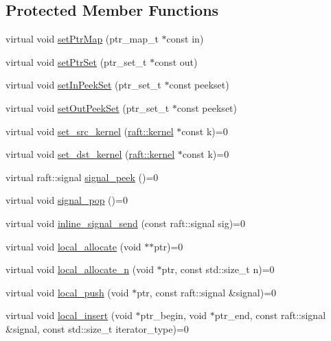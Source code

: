 \subsection*{Protected Member Functions}
\begin{DoxyCompactItemize}
\item 
virtual void \hyperlink{class_f_i_f_o_a6d7f0cf28c0eba5eaa12c347734dbdf2}{set\+Ptr\+Map} (ptr\+\_\+map\+\_\+t $\ast$const in)
\item 
virtual void \hyperlink{class_f_i_f_o_a866988c11d53fae77d6ac6f0b56aae56}{set\+Ptr\+Set} (ptr\+\_\+set\+\_\+t $\ast$const out)
\item 
virtual void \hyperlink{class_f_i_f_o_abccc27a45f6590bb8529513c411b0b5a}{set\+In\+Peek\+Set} (ptr\+\_\+set\+\_\+t $\ast$const peekset)
\item 
virtual void \hyperlink{class_f_i_f_o_aaf19d035ab4e130dbcd78c576cdf0dae}{set\+Out\+Peek\+Set} (ptr\+\_\+set\+\_\+t $\ast$const peekset)
\item 
virtual void \hyperlink{class_f_i_f_o_aa9c1f679b4e2585047af2c09a2518209}{set\+\_\+src\+\_\+kernel} (\hyperlink{classraft_1_1kernel}{raft\+::kernel} $\ast$const k)=0
\item 
virtual void \hyperlink{class_f_i_f_o_a11422695c75c05ad2c60e662553f2667}{set\+\_\+dst\+\_\+kernel} (\hyperlink{classraft_1_1kernel}{raft\+::kernel} $\ast$const k)=0
\item 
virtual raft\+::signal \hyperlink{class_f_i_f_o_a36a7519af834c969d49f3d9ae7080af9}{signal\+\_\+peek} ()=0
\item 
virtual void \hyperlink{class_f_i_f_o_ad6b606d47361489007490e0e0b4e2aa1}{signal\+\_\+pop} ()=0
\item 
virtual void \hyperlink{class_f_i_f_o_ae7e91c74078cd52cdfc6f3609b83c8eb}{inline\+\_\+signal\+\_\+send} (const raft\+::signal sig)=0
\item 
virtual void \hyperlink{class_f_i_f_o_a60068cb00b13626e41d4b11099354ae3}{local\+\_\+allocate} (void $\ast$$\ast$ptr)=0
\item 
virtual void \hyperlink{class_f_i_f_o_a4acc34ebbad9df32f54ae8c618ffa0c0}{local\+\_\+allocate\+\_\+n} (void $\ast$ptr, const std\+::size\+\_\+t n)=0
\item 
virtual void \hyperlink{class_f_i_f_o_a4ef48ce2cb02e8bd5d381bb65687e6cb}{local\+\_\+push} (void $\ast$ptr, const raft\+::signal \&signal)=0
\item 
virtual void \hyperlink{class_f_i_f_o_ab3e42eddd74c0c5ce4a640c0cc022245}{local\+\_\+insert} (void $\ast$ptr\+\_\+begin, void $\ast$ptr\+\_\+end, const raft\+::signal \&signal, const std\+::size\+\_\+t iterator\+\_\+type)=0
$$
\end{DoxyCompactItemize}
